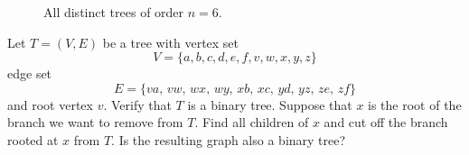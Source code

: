\begin{figure}[!htbp]
\centering
{}

\caption{All distinct trees of order $n = 6$.}
\label{fig:trees_forests:distinct_trees_specified_order_6}
\end{figure}

\begin{example}
\label{eg:trees_forests:branch_cut_binary_tree}
Let $T = (V, E)$ be a tree with vertex set
\[
V
=
\{a, b, c, d, e, f, v, w, x, y, z\}
\]
edge set
\[
E
=
\{va,\, vw,\, wx,\, wy,\, xb,\, xc,\, yd,\, yz,\, ze,\, zf\}
\]
and root vertex $v$. Verify that $T$ is a binary
tree. Suppose that $x$ is the root of the branch we
want to remove from $T$. Find all children of $x$ and
cut off the branch rooted at $x$ from $T$. Is the
resulting graph also a binary tree?
\end{example}

